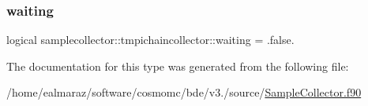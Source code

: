 \subsubsection{\texorpdfstring{waiting}{waiting}}
{\footnotesize\ttfamily logical samplecollector\+::tmpichaincollector\+::waiting = .false.\hspace{0.3cm}{\ttfamily [private]}}



The documentation for this type was generated from the following file\+:\begin{DoxyCompactItemize}
\item 
/home/ealmaraz/software/cosmomc/bde/v3./source/\mbox{\hyperlink{SampleCollector_8f90}{Sample\+Collector.\+f90}}\end{DoxyCompactItemize}
